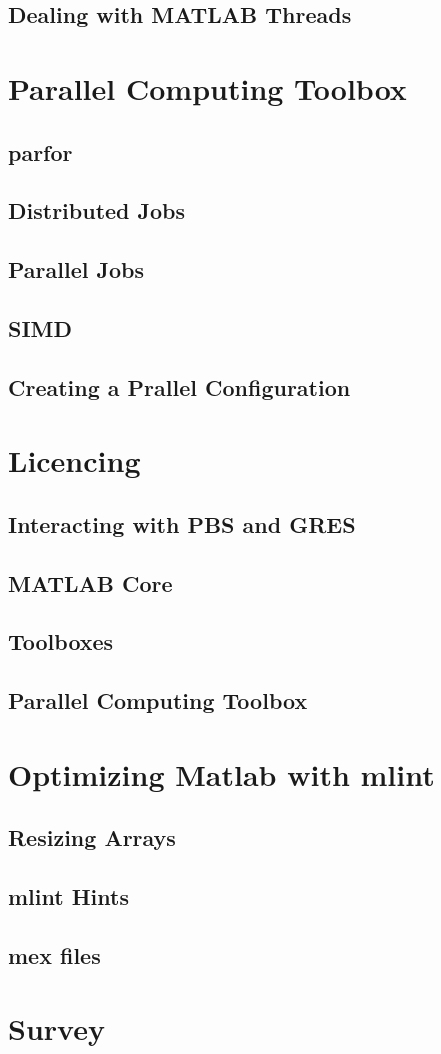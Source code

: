 \documentclass[handout]{beamer}
\begin{document}
   \subsection{Dealing with MATLAB Threads}
  \section{Parallel Computing Toolbox}
   \subsection{parfor}
   \subsection{Distributed Jobs}
   \subsection{Parallel Jobs}
   \subsection{SIMD}
   \subsection{Creating a Prallel Configuration}
  \section{Licencing}
   \subsection{Interacting with PBS and GRES}
   \subsection{MATLAB Core}
   \subsection{Toolboxes}
   \subsection{Parallel Computing Toolbox}
  \section{Optimizing Matlab with mlint}
   \subsection{Resizing Arrays}
   \subsection{mlint Hints}
   \subsection{mex files}
  \section{Survey}
\end{document}
